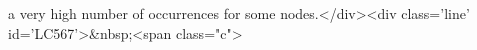a very high number of occurrences for some nodes.</div><div class='line' id='LC567'>&nbsp;<span class="c">%